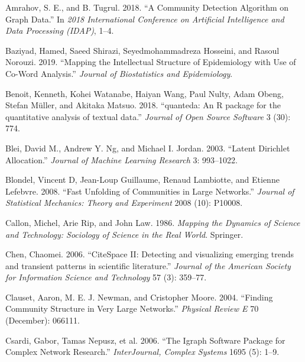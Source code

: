 \hypertarget{refs}{}
\begin{CSLReferences}{1}{0}
\leavevmode{}%
Amrahov, S. E., and B. Tugrul. 2018. {``A Community Detection Algorithm on Graph Data.''} In \emph{2018 International Conference on Artificial Intelligence and Data Processing (IDAP)}, 1--4.

\leavevmode{}%
Baziyad, Hamed, Saeed Shirazi, Seyedmohammadreza Hosseini, and Rasoul Norouzi. 2019. {``Mapping the Intellectual Structure of Epidemiology with Use of Co-Word Analysis.''} \emph{Journal of Biostatistics and Epidemiology}.

\leavevmode{}%
Benoit, Kenneth, Kohei Watanabe, Haiyan Wang, Paul Nulty, Adam Obeng, Stefan Müller, and Akitaka Matsuo. 2018. {``{quanteda: An R package for the quantitative analysis of textual data}.''} \emph{Journal of Open Source Software} 3 (30): 774.

\leavevmode{}%
Blei, David M., Andrew Y. Ng, and Michael I. Jordan. 2003. {``Latent Dirichlet Allocation.''} \emph{Journal of Machine Learning Research} 3: 993--1022.

\leavevmode{}%
Blondel, Vincent D, Jean-Loup Guillaume, Renaud Lambiotte, and Etienne Lefebvre. 2008. {``Fast Unfolding of Communities in Large Networks.''} \emph{Journal of Statistical Mechanics: Theory and Experiment} 2008 (10): P10008.

\leavevmode{}%
Callon, Michel, Arie Rip, and John Law. 1986. \emph{Mapping the Dynamics of Science and Technology: Sociology of Science in the Real World}. Springer.

\leavevmode{}%
Chen, Chaomei. 2006. {``{CiteSpace II: Detecting and visualizing emerging trends and transient patterns in scientific literature}.''} \emph{Journal of the American Society for Information Science and Technology} 57 (3): 359--77.

\leavevmode{}%
Clauset, Aaron, M. E. J. Newman, and Cristopher Moore. 2004. {``Finding Community Structure in Very Large Networks.''} \emph{Physical Review E} 70 (December): 066111.

\leavevmode{}%
Csardi, Gabor, Tamas Nepusz, et al. 2006. {``The Igraph Software Package for Complex Network Research.''} \emph{InterJournal, Complex Systems} 1695 (5): 1--9.


\end{CSLReferences}
